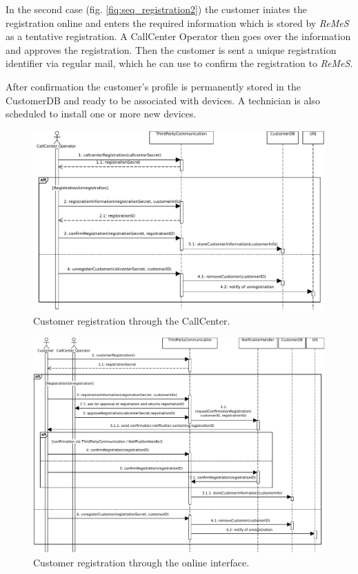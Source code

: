 \documentclass[a4paper,10pt]{article}
\newcommand{\rem}{\emph{ReMeS}\xspace}
\begin{document}
In the second case (fig. \ref{fiq:seq_registration2}) the customer iniates the registration online and enters the required information which is stored by \rem as a tentative registration.
A CallCenter Operator then goes over the information and approves the registration.
Then the customer is sent a unique registration identifier via regular mail, which he can use to confirm the registration to \rem.

After confirmation the customer's profile is permanently stored in the CustomerDB and ready to be associated with devices.
A technician is also scheduled to install one or more new devices.

\begin{figure}[!htp]
    \centering
    \includegraphics[width=\textwidth]{Registration_ CallCenter}
    \caption{Customer registration through the CallCenter.}
    \label{fig:seq_registration1}
\end{figure}

\begin{figure}[!htp]
    \centering
    \includegraphics[width=\textwidth]{Registration_ Customer}
    \caption{Customer registration through the online interface.}
    \label{fig:seq_registration2}
\end{figure}
\end{document}
